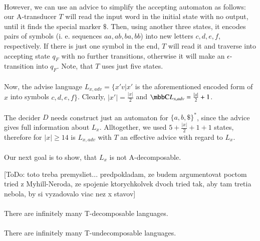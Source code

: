 \paragraph{}
However, we can use an advice to simplify the accepting automaton as follows: our A-transducer $T$ will read the input word in the initial state with no output, until it finds the special marker $\$ $. Then, using another three states, it encodes pairs of symbols (i. e. sequences $aa, ab, ba, bb$) into new letters $c, d, e, f$, respectively. If there is just one symbol in the end, $T$ will read it and traverse into accepting state $q_F$ with no further transitions, otherwise it will make an $\epsilon $-transition into $q_{F}$. Note, that $T$ uses just five states.

\paragraph{}
Now, the advise language $L_{x,adv} = \{ x'v | x'$ is the aforementioned encoded form of $x$ into symbols $c,d,e,f \}$. Clearly, $|x'| = \frac{|x|}{2}$ and $\C{L_{x,adv}} = \frac{|x|}{2}+1$.

\paragraph{}
The decider $D$ needs construct just an automaton for $\{a,b,\$\}^*$, since the advice gives full information about $L_x$. Alltogether, we used $5 + \frac{|x|}{2}+1+1$ states, therefore for $|x| \geq 14$ is $L_{x,adv}$ with $T$ an effective advice with regard to $L_x$.

\paragraph{}
Our next goal is to show, that $L_x$ is not A-decomposable.

 \color{red}[ToDo: toto treba premysliet... predpokladam, ze budem argumentovat poctom tried z Myhill-Neroda, ze spojenie ktorychkolvek dvoch tried tak, aby tam tretia nebola, by si vyzadovalo viac nez x stavov]\color{black}\\
\square

\paragraph{}
\cdosledok There are infinitely many T-decomposable languages.

\paragraph{}
\cveta There are infinitely many T-undecomposable languages.

